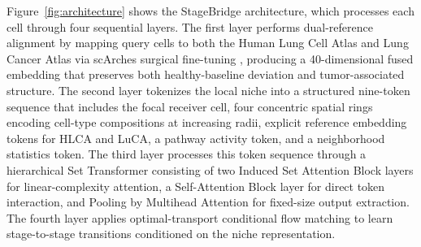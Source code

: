 \documentclass[conference]{IEEEtran}
\begin{document}
Figure~\ref{fig:architecture} shows the StageBridge architecture, which processes each cell through four sequential layers. The first layer performs dual-reference alignment by mapping query cells to both the Human Lung Cell Atlas and Lung Cancer Atlas via scArches surgical fine-tuning \cite{Lotfollahi2022-fc}, producing a 40-dimensional fused embedding that preserves both healthy-baseline deviation and tumor-associated structure. The second layer tokenizes the local niche into a structured nine-token sequence that includes the focal receiver cell, four concentric spatial rings encoding cell-type compositions at increasing radii, explicit reference embedding tokens for HLCA and LuCA, a pathway activity token, and a neighborhood statistics token. The third layer processes this token sequence through a hierarchical Set Transformer consisting of two Induced Set Attention Block layers for linear-complexity attention, a Self-Attention Block layer for direct token interaction, and Pooling by Multihead Attention for fixed-size output extraction. The fourth layer applies optimal-transport conditional flow matching to learn stage-to-stage transitions conditioned on the niche representation.
\end{document}
